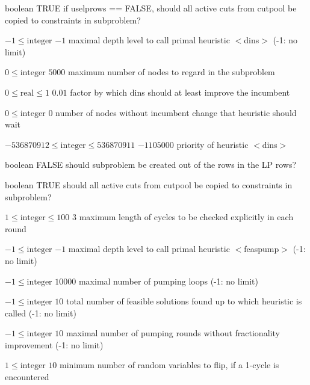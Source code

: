 %
{boolean}%
{TRUE}%
{if uselprows == FALSE, should all active cuts from cutpool be copied to constraints in subproblem?}%
{}

%
{$-1\leq\textrm{integer}$}%
{$-1$}%
{maximal depth level to call primal heuristic $<$dins$>$ (-1: no limit)}%
{}

%
{$0\leq\textrm{integer}$}%
{$5000$}%
{maximum number of nodes to regard in the subproblem}%
{}

%
{$0\leq\textrm{real}\leq1$}%
{$0.01$}%
{factor by which dins should at least improve the incumbent}%
{}

%
{$0\leq\textrm{integer}$}%
{$0$}%
{number of nodes without incumbent change that heuristic should wait}%
{}

%
{$-536870912\leq\textrm{integer}\leq536870911$}%
{$-1105000$}%
{priority of heuristic $<$dins$>$}%
{}

%
{boolean}%
{FALSE}%
{should subproblem be created out of the rows in the LP rows?}%
{}

%
{boolean}%
{TRUE}%
{should all active cuts from cutpool be copied to constraints in subproblem?}%
{}

%
{$1\leq\textrm{integer}\leq100$}%
{$3$}%
{maximum length of cycles to be checked explicitly in each round}%
{}

%
{$-1\leq\textrm{integer}$}%
{$-1$}%
{maximal depth level to call primal heuristic $<$feaspump$>$ (-1: no limit)}%
{}

%
{$-1\leq\textrm{integer}$}%
{$10000$}%
{maximal number of pumping loops (-1: no limit)}%
{}

%
{$-1\leq\textrm{integer}$}%
{$10$}%
{total number of feasible solutions found up to which heuristic is called (-1: no limit)}%
{}

%
{$-1\leq\textrm{integer}$}%
{$10$}%
{maximal number of pumping rounds without fractionality improvement (-1: no limit)}%
{}

%
{$1\leq\textrm{integer}$}%
{$10$}%
{minimum number of random variables to flip, if a 1-cycle is encountered}%
{}

